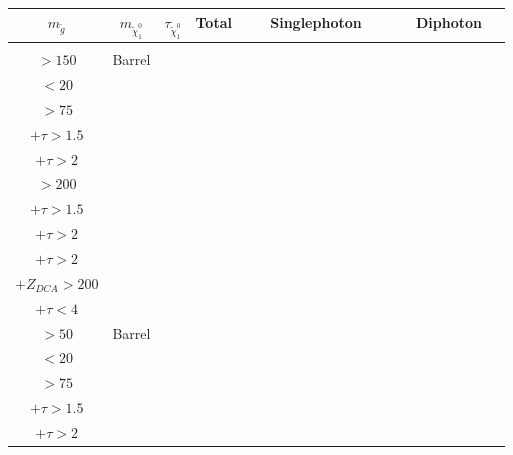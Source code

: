 \documentclass[8pt]{extarticle}
\begin{document}
\begin{longtable}{|c|c|c|c|c|c|c|c|c|c|c|c|c|c|c|c|c|c|c|c|c|c|c|}
\hline 
$m_{\tilde{g}}$ & $m_{\tilde{\chi}_1^0}$ & $\tau_{\tilde{\chi}_1^0}$ & Total & \multicolumn{11}{|c|}{Singlephoton} & \multicolumn{8}{|c|}{Diphoton} \\ 
\hline 
 & & & & \begin{tabular}{@{}c@{}} $p_T$ \\ $> 150$\end{tabular} & Barrel & \begin{tabular}{@{}c@{}} $E_T^{miss}$ \\ $< 20$\end{tabular} & \begin{tabular}{@{}c@{}} $E_T^{miss}$ \\ $> 75$\end{tabular} & \begin{tabular}{@{}c@{}} $E_T^{miss} > 75$ \\ $+ \tau > 1.5$ \end{tabular} & \begin{tabular}{@{}c@{}} $E_T^{miss} > 75$ \\ $+ \tau > 2$ \end{tabular} & \begin{tabular}{@{}c@{}} $E_T^{miss}$ \\ $> 200$\end{tabular} & \begin{tabular}{@{}c@{}} $E_T^{miss} > 200$ \\ $+ \tau > 1.5$ \end{tabular} & \begin{tabular}{@{}c@{}} $E_T^{miss} > 200$ \\ $+ \tau > 2$ \end{tabular} & \begin{tabular}{@{}c@{}} $E_T^{miss} > 200$ \\ $+ \tau > 2$ \\ $+Z_{DCA} > 200$\end{tabular} & \begin{tabular}{@{}c@{}} $E_{T}^{miss} > 200$ \\ $+ \tau < 4$ \end{tabular} & \begin{tabular}{@{}c@{}} $p_T$ \\ $> 50$\end{tabular} & Barrel & \begin{tabular}{@{}c@{}} $E_T^{miss}$ \\ $< 20$\end{tabular} & \begin{tabular}{@{}c@{}} $E_T^{miss}$ \\ $> 75$\end{tabular} & \begin{tabular}{@{}c@{}} $E_T^{miss} > 75$ \\ $+ \tau > 1.5$\end{tabular} & \begin{tabular}{@{}c@{}} $E_T^{miss} > 75$ \\ $+ \tau > 2$ \end{tabular} & 
\end{longtable}
\end{document}
